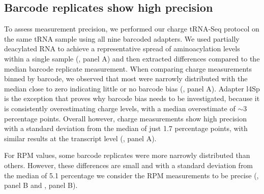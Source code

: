 \documentclass[9pt,lineno]{elife}
\begin{document}
\subsection{Barcode replicates show high precision}
To assess measurement precision, we performed our charge tRNA-Seq protocol on the same tRNA sample using all nine barcoded adapters.
We used partially deacylated RNA to achieve a representative spread of aminoacylation levels within a single sample (, panel A) and then extracted differences compared to the median barcode replicate measurement.
When comparing charge measurements binned by barcode, we observed that most were narrowly distributed with the median close to zero indicating little or no barcode bias (, panel A).
Adapter l4Sp is the exception that proves why barcode bias needs to be investigated, because it is consistently overestimating charge levels, with a median overestimate of $\sim$3 percentage points.
Overall however, charge measurements show high precision with a standard deviation from the median of just 1.7 percentage points, with similar results at the transcript level (, panel A).

For RPM values, some barcode replicates were more narrowly distributed than others. However, these differences are small and with a standard deviation from the median of 5.1 percentage we consider the RPM measurements to be precise (, panel B and , panel B).
\end{document}
